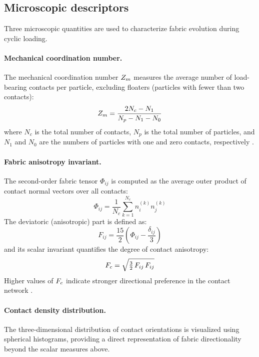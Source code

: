 \subsection{Microscopic descriptors}
\label{subsec:micro_descriptors}

Three microscopic quantities are used to characterize fabric evolution during cyclic loading.

\paragraph{Mechanical coordination number.}
The mechanical coordination number $Z_m$ measures the average number of load-bearing contacts per particle, excluding floaters (particles with fewer than two contacts):
\begin{equation}
  Z_m = \frac{2N_c - N_1}{N_p - N_1 - N_0}
  \label{eq:zm}
\end{equation}
where $N_c$ is the total number of contacts, $N_p$ is the total number of particles, and $N_1$ and $N_0$ are the numbers of particles with one and zero contacts, respectively \citep{Thornton2000}.

\paragraph{Fabric anisotropy invariant.}
The second-order fabric tensor $\Phi_{ij}$ is computed as the average outer product of contact normal vectors over all contacts:
\begin{equation}
  \Phi_{ij} = \frac{1}{N_c} \sum_{k=1}^{N_c} n_i^{(k)} n_j^{(k)}
  \label{eq:fabric_tensor}
\end{equation}
The deviatoric (anisotropic) part is defined as:
\begin{equation}
  F_{ij} = \frac{15}{2}\!\left(\Phi_{ij} - \frac{\delta_{ij}}{3}\right)
  \label{eq:deviatoric_fabric}
\end{equation}
and its scalar invariant quantifies the degree of contact anisotropy:
\begin{equation}
  F_c = \sqrt{\tfrac{3}{2}\, F_{ij}\, F_{ij}}
  \label{eq:fc}
\end{equation}
Higher values of $F_c$ indicate stronger directional preference in the contact network \citep{Oda1982fabric}.

\paragraph{Contact density distribution.}
The three-dimensional distribution of contact orientations is visualized using spherical histograms, providing a direct representation of fabric directionality beyond the scalar measures above.

